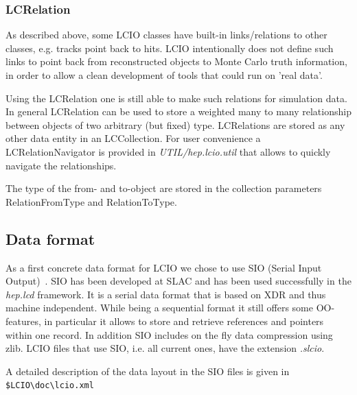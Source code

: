 \documentclass[twoside]{article}
\begin{document}
\subsubsection{LCRelation}
As described above, some LCIO classes have built-in links/relations to other classes, e.g. tracks point back to 
hits. LCIO intentionally does not define such links to point back from reconstructed objects to Monte Carlo truth 
information, in order to allow a clean development of tools that could run on 'real data'.

Using the LCRelation one is still able to make such relations for simulation data. In general LCRelation can be
used to store a weighted many to many relationship between objects of two arbitrary (but fixed) type.
LCRelations are stored as any other data entity in an LCCollection. For user convenience a LCRelationNavigator
is provided in {\it UTIL/hep.lcio.util} that allows to quickly navigate the relationships.

The type of the from- and to-object are stored in the collection parameters RelationFromType and RelationToType.


\subsection{Data format \label{sec_sio}}

As a first concrete data format for LCIO we chose to use SIO (Serial Input Output)~\cite{sio_doc}.
SIO has been developed at SLAC and has been used successfully in the {\em hep.lcd}
framework. It is a serial data format that is based on XDR and thus machine 
independent. While being a sequential format it still offers some OO-features, in 
particular it allows to store and retrieve references and pointers within one record.
In addition SIO includes on the fly data compression using zlib.
LCIO files that use SIO, i.e. all current ones, have the extension {\em .slcio}.

A detailed description of the data layout in the SIO files is given in \verb# $LCIO\doc\lcio.xml# %

\end{document}
